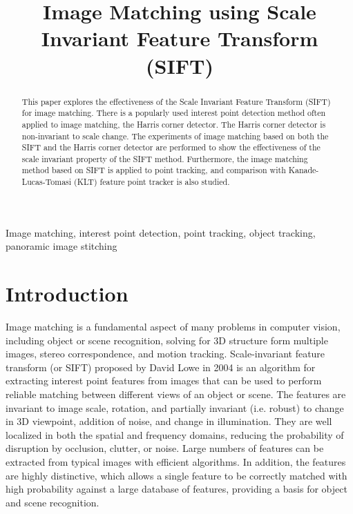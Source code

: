 \documentclass{article}
\title{Image Matching using Scale Invariant Feature Transform (SIFT)}
\begin{document}
% 
\maketitle
% 
\begin{abstract}
This paper explores the effectiveness of the Scale Invariant Feature Transform (SIFT) for image matching. 
There is a popularly used interest point detection method often applied to image matching, the Harris corner detector. 
The Harris corner detector is non-invariant to scale change. 
The experiments of image matching based on both the SIFT and the Harris corner detector are performed to show 
the effectiveness of the scale invariant property of the SIFT method. 
Furthermore, the image matching method based on SIFT is applied to point tracking, 
and comparison with Kanade-Lucas-Tomasi (KLT) feature point tracker is also studied. 

\end{abstract}
% 
\begin{keywords}
Image matching, interest point detection, point tracking, object tracking, panoramic image stitching

\end{keywords}
% 
\section{Introduction}
\label{sec:intro}

Image matching is a fundamental aspect of many problems in computer vision, including object or scene recognition, solving for 3D structure form multiple images, stereo correspondence, and motion tracking. 
Scale-invariant feature transform (or SIFT) proposed by David Lowe in 2004 \cite{dLowe04} is an algorithm for extracting interest point features from images that can be used to perform reliable matching between different views of an object or scene. 
The features are invariant to image scale, rotation, and partially invariant (i.e. robust) to change in 3D viewpoint, addition of noise, and change in illumination. 
They are well localized in both the spatial and frequency domains, reducing the probability of disruption by occlusion, clutter, or noise. Large numbers of features can be extracted from typical images with efficient algorithms. 
In addition, the features are highly distinctive, which allows a single feature to be correctly matched with high probability against a large database of features, providing a basis for object and scene recognition.
\end{document}
